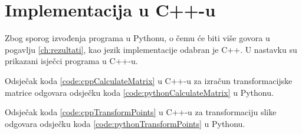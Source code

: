 \section{Implementacija u C++-u}
\label{sec:implC++}
\lstset{
	language=C++, 
	tabsize=2,
	numbers=left,
	breaklines=true,
	basicstyle=\ttfamily,
	columns=fixed
}

Zbog sporog izvođenja programa u Pythonu, o čemu će biti više govora u pogavlju \ref{ch:rezultati}, kao jezik implementacije odabran je C++. U nastavku su prikazani isječci programa u C++-u.



Odsječak koda \ref{code:cppCalculateMatrix} u C++-u za izračun transformacijske matrice odgovara odsječku koda \ref{code:pythonCalculateMatrix} u Pythonu.



Odsječak koda \ref{code:cppTransformPoints} u C++-u za transformaciju slike odgovara odsječku koda \ref{code:pythonTransformPoints} u Pythonu.
